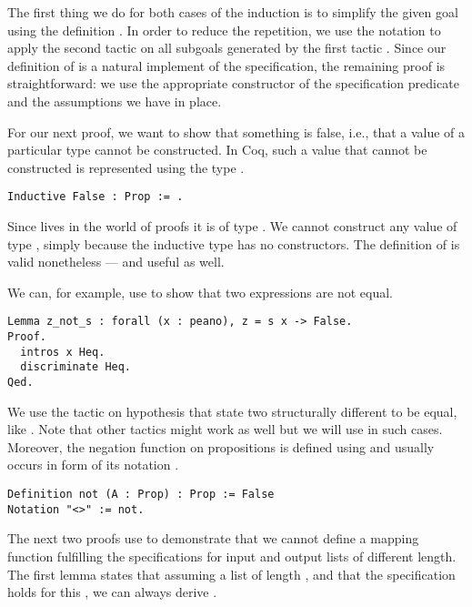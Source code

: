 The first thing we do for both cases of the induction is to simplify the given goal using the definition .
In order to reduce the repetition, we use the notation  to apply the second tactic  on all subgoals generated by the first tactic .
Since our definition of  is a natural implement of the specification, the remaining proof is straightforward: we use the appropriate constructor of the specification predicate and the assumptions we have in place.

For our next proof, we want to show that something is false, i.e., that a value of a particular type cannot be constructed.
In Coq, such a value that cannot be constructed is represented using the type .

\begin{verbatim}
Inductive False : Prop := .
\end{verbatim}

Since  lives in the world of proofs it is of type .
We cannot construct any value of type , simply because the inductive type has no constructors.
The definition of  is valid nonetheless --- and useful as well.

We can, for example, use  to show that two expressions are not equal.

\begin{verbatim}
Lemma z_not_s : forall (x : peano), z = s x -> False.
Proof.
  intros x Heq.
  discriminate Heq.
Qed.
\end{verbatim}

We use the tactic  on hypothesis that state two structurally different to be equal, like .
Note that other tactics might work as well but we will use  in such cases.
Moreover, the negation function on propositions  is defined using  and usually occurs in form of its notation \cinl{<>}.

\begin{verbatim}
Definition not (A : Prop) : Prop := False
Notation "<>" := not.
\end{verbatim}

The next two proofs use  to demonstrate that we cannot define a mapping function fulfilling the specifications for input and output lists of different length.
The first lemma states that assuming a list  of length ,  and that the specification holds for this , we can always derive .

